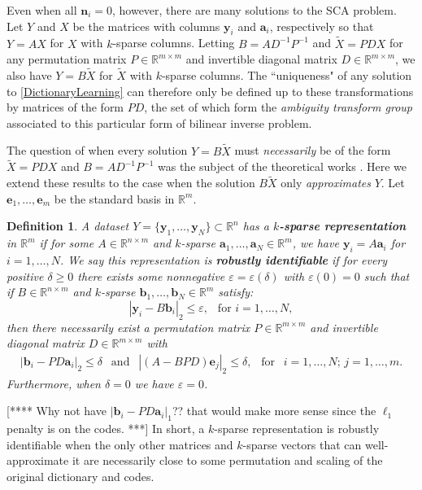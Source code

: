 \documentclass[journal, onecolumn]{IEEEtran}
\newtheorem{definition}{Definition}
\begin{document}
Even when all $\mathbf{n}_i = 0$, however, there are many solutions to the SCA problem. Let $Y$ and $X$ be the matrices with columns $\mathbf{y}_i$ and $\mathbf{a}_i$, respectively so that $Y = AX$ for $X$ with $k$-sparse columns. Letting $B = AD^{-1}P^{-1}$ and $\tilde X = PDX$ for any permutation matrix $P \in \mathbb{R}^{m \times m}$ and invertible diagonal matrix $D \in \mathbb{R}^{m \times m}$, we also have $Y = B \tilde X$ for $\tilde X$ with $k$-sparse columns. The ``uniqueness" of any solution to \eqref{DictionaryLearning} can therefore only be defined up to these transformations by matrices of the form $PD$, the set of which form the \emph{ambiguity transform group} \cite{?} associated to this particular form of bilinear inverse problem. 

The question of when every solution $Y = B \tilde X$ must \emph{necessarily} be of the form $\tilde X = PDX$ and $B = AD^{-1}P^{-1}$ was the subject of the theoretical works \cite{Georgiev05, Aharon06, Hillar15}. Here we extend these results to the case when the solution $B \tilde X$ only \emph{approximates} $Y$. Let $\mathbf{e}_1, \ldots, \mathbf{e}_m$ be the standard basis in $\mathbb{R}^m$. 

\begin{definition}\label{Uniqueness}
A dataset $Y = \{\mathbf{y}_1, \ldots, \mathbf{y}_N\} \subset \mathbb{R}^n$ has a \textbf{$k$-sparse representation} in $\mathbb{R}^m$ if for some $A \in \mathbb{R}^{n \times m}$ and $k$-sparse $\mathbf{a}_1, \ldots, \mathbf{a}_N \in \mathbb{R}^m$, we have $\mathbf{y}_i = A\mathbf{a}_i$ for $i = 1, \ldots, N$. We say this representation is \textbf{robustly identifiable} if for every positive $\delta \geq 0$ there exists some nonnegative $\varepsilon = \varepsilon(\delta)$ with $\varepsilon(0) = 0$ such that if $B \in \mathbb{R}^{n \times m}$ and $k$-sparse $\mathbf{b}_1, \ldots, \mathbf{b}_N \in \mathbb{R}^m$ satisfy:
\[|\mathbf{y}_i - B\mathbf{b}_i|_2 \leq \varepsilon, \ \ \text{ for } i = 1, \ldots, N,\]
%
then there necessarily exist a permutation matrix $P \in \mathbb{R}^{m \times m}$ and invertible diagonal matrix $D \in \mathbb{R}^{m \times m}$ with
\begin{align}\label{def1}
|\mathbf{b}_i - PD\mathbf{a}_i|_2 \leq \delta \ \ \text{ and } \ \ |(A - BPD)\mathbf{e}_j|_2 \leq \delta, \ \ \text{ for } \ \ i = 1, \ldots, N; \, j = 1, \ldots, m.
\end{align}
Furthermore, when $\delta = 0$ we have $\varepsilon = 0$.
\end{definition}
[**** Why not have $|\mathbf{b}_i - PD\mathbf{a}_i|_1$??  that would make more sense since the $\ell_1$ penalty is on the codes.  ***]
In short, a $k$-sparse representation is robustly identifiable when the only other matrices and $k$-sparse vectors that can well-approximate it are necessarily close to some permutation and scaling of the original dictionary and codes.
\end{document}
